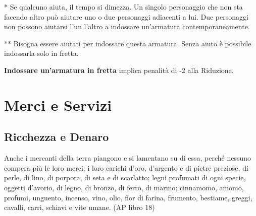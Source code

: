 \documentclass[12pt,a4paper,twoside,openany]{book}
\begin{document}
\bigskip

\begin{multicols}{2}

{*} Se qualcuno aiuta, il tempo si dimezza. Un singolo personaggio che non sta facendo altro può aiutare uno o due personaggi adiacenti a lui. Due personaggi non possono aiutarsi l'un l'altro a indossare un'armatura contemporaneamente.

{*}{*} Bisogna essere aiutati per indossare questa armatura. Senza aiuto è possibile indossarla solo in fretta.

\textbf{Indossare un'armatura in fretta} implica penalità di -2 alla Riduzione.


\end{multicols}

\pagebreak

\section{Merci e Servizi}


\subsection{Ricchezza e Denaro}


\begin{changemargin}{0.3cm}{0.3cm}\begin{enfasi}{
Anche i mercanti della terra piangono e si lamentano su di essa, perché nessuno compera più le loro merci: i loro carichi d’oro, d’argento e di pietre preziose, di perle, di lino, di porpora, di seta e di scarlatto; legni profumati di ogni specie, oggetti d’avorio, di legno, di bronzo, di ferro, di marmo; cinnamomo, amomo, profumi, unguento, incenso, vino, olio, fior di farina, frumento, bestiame, greggi, cavalli, carri, schiavi e vite umane. (AP libro 18)
}
\end{enfasi}\end{changemargin}\medskip
\end{document}
